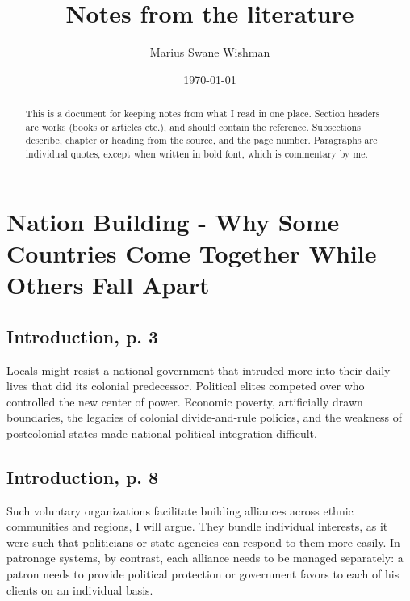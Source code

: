 \documentclass[12pt]{article}
\title{Notes from the literature}
\author[1]{Marius Swane Wishman}
\affil[1]{Department of Sociology and Political Science, NTNU}
\date{\today}
\begin{document}
\maketitle

\begin{abstract}

	This is a document for keeping notes from what I read in one place.
	Section headers are works (books or articles etc.), and should contain
	the reference. Subsections describe, chapter or heading from the source,
	and the page number. Paragraphs are individual quotes, except when
	written in bold font, which is commentary by me.

\end{abstract}

\pagebreak

\tableofcontents

\pagebreak

\onehalfspacing
\section{Nation Building - Why Some Countries Come Together While Others Fall 
	Apart \citep{Wimmer_2018}}

\subsection{Introduction, p. 3}

Locals might resist a national government that intruded more into their daily
lives that did its colonial predecessor.  Political elites competed over who
controlled the new center of power.  Economic poverty, artificially drawn
boundaries, the legacies of colonial divide-and-rule policies, and the weakness
of postcolonial states made national political integration difficult.

\subsection{Introduction, p. 8}

Such voluntary organizations facilitate building alliances across ethnic
communities and regions, I will argue.  They bundle individual interests, as it
were such that politicians or state agencies can respond to them more easily.
In patronage systems, by contrast, each alliance needs to be managed separately:
a patron needs to provide political protection or government favors to each of
his clients on an individual basis.
\end{document}
